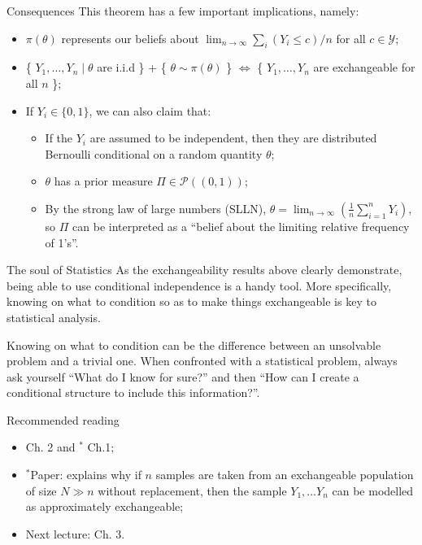 \begin{frame}{Consequences}
  This theorem has a few important implications, namely:
 \begin{itemize}
  \item $\pi(\theta)$ represents our beliefs about $\lim_{n\to\infty} \sum_i (Y_i \leq c)/n$ for all $c \in \mathcal{Y}$;
  \item \{ $Y_1, \ldots, Y_n \mid \theta $ are i.i.d \} + \{ $\theta \sim \pi(\theta)$ \} $\iff$ \{ $Y_1, \ldots, Y_n$ are exchangeable for all $n$ \};
  \item If $Y_i \in \{0, 1\}$, we can also claim that:
  \begin{itemize}
   \item If the $Y_i$ are assumed to be independent, then they are distributed Bernoulli conditional on a random quantity $\theta$;
   \item $\theta$ has a prior measure $\Pi \in \mathcal{P}( (0, 1) )$;
   \item By the strong law of large numbers (SLLN), $\theta = \lim_{n \to \infty} (\frac{1}{n}\sum_{i=1}^n Y_i)$, so $\Pi$ can be interpreted as a ``belief about the limiting relative frequency of 1's''.
  \end{itemize}
 \end{itemize}
\end{frame}
\begin{frame}{The soul of Statistics}
 As the exchangeability results above clearly demonstrate, being able to use conditional independence is a handy tool.
 More specifically, knowing on what to condition so as to make things exchangeable is key to statistical analysis.
 \begin{idea} 
 Knowing on what to condition can be the difference between an unsolvable problem and a trivial one.
 When confronted with a statistical problem, always ask yourself ``What do I know for sure?'' and then ``How can I create a conditional structure to include this information?''.
 \end{idea}
\end{frame}
\begin{frame}{Recommended reading}
\begin{itemize}
  \item[\faBook] \cite{Hoff2009} Ch. 2 and $^\ast$\cite{Schervish2012} Ch.1;
 \item $^\ast$Paper: \cite{Diaconis1980} explains why if $n$ samples are taken from an exchangeable population of size $N \gg n$ without replacement, then the sample $Y_1, \ldots Y_n$ can be modelled as approximately exchangeable;
 \item[\faForward] Next lecture: \cite{Robert2007} Ch. 3.
 \end{itemize} 
\end{frame}
